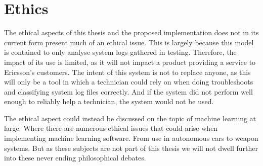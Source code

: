\section{Ethics}
The ethical aspects of this thesis and the proposed implementation does not in its current form present much of an ethical issue. This is largely because this model is contained to only analyse system logs gathered in testing. Therefore, the impact of its use is limited, as it will not impact a product providing a service to Ericsson's customers. The intent of this system is not to replace anyone, as this will only be a tool in which a technician could rely on when doing troubleshoots and classifying system log files correctly. And if the system did not perform well enough to reliably help a technician, the system would not be used. 


The ethical aspect could instead be discussed on the topic of machine learning at large. Where there are numerous ethical issues that could arise when implementing machine learning software. From use in autonomous cars to weapon systems. But as these subjects are not part of this thesis we will not dwell further into these never ending philosophical debates. 